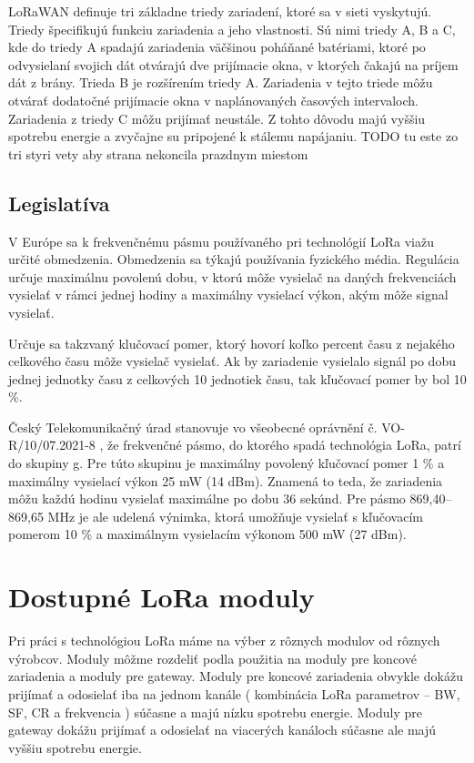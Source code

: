 \documentclass[slovak,master]{diploma}
\begin{document}
LoRaWAN definuje tri základne triedy zariadení, ktoré sa v sieti vyskytujú. Triedy špecifikujú funkciu zariadenia a jeho vlastnosti.
Sú nimi triedy A, B a C, kde do triedy A spadajú zariadenia väčšinou poháňané batériami, ktoré po odvysielaní svojich dát otvárajú dve prijímacie okna, 
v ktorých čakajú na príjem dát z brány.
Trieda B je rozšírením triedy A. Zariadenia v tejto triede môžu otvárať dodatočné prijímacie okna v naplánovaných časových intervaloch.
Zariadenia z triedy C môžu prijímať neustále. Z tohto dôvodu majú vyššiu spotrebu energie a zvyčajne su pripojené k stálemu napájaniu.
TODO tu este zo tri styri  vety aby strana nekoncila prazdnym miestom

\section{Legislatíva}
V Európe sa k frekvenčnému pásmu používaného pri technológií LoRa viažu určité obmedzenia. 
Obmedzenia sa týkajú používania fyzického média. Regulácia určuje maximálnu povolenú dobu, v ktorú môže vysielač na daných frekvenciách vysielať 
v rámci jednej hodiny a maximálny vysielací výkon, akým môže signal vysielať.

Určuje sa takzvaný klučovací pomer, ktorý hovorí koľko percent času z nejakého celkového času môže vysielač vysielať.
Ak by zariadenie vysielalo signál po dobu jednej jednotky času z celkových 10 jednotiek času, tak kľučovací pomer by bol 10 \%.

Český Telekomunikačný úrad stanovuje vo všeobecné oprávnění č. VO-R/10/07.2021-8 \cite{vor}, že 
frekvenčné pásmo, do ktorého spadá technológia LoRa, patrí do skupiny g. Pre túto skupinu je maximálny povolený kľučovací pomer 1 \% a maximálny 
vysielací výkon 25 mW (14 dBm). Znamená to teda, že zariadenia môžu každú hodinu vysielať maximálne po dobu 36 sekúnd.
Pre pásmo 869,40--869,65 MHz je ale udelená výnimka, ktorá umožňuje vysielať s kľučovacím pomerom 10 \% a maximálnym vysielacím výkonom 500 mW (27 dBm).

\chapter{Dostupné LoRa moduly }
Pri práci s technológiou LoRa máme na výber z rôznych modulov od rôznych výrobcov.
Moduly môžme rozdeliť podla použitia na moduly pre koncové zariadenia a moduly pre gateway.
Moduly pre koncové zariadenia obvykle dokážu prijímať a odosielať iba na jednom kanále ( kombinácia LoRa parametrov --  BW, SF, CR a frekvencia ) súčasne a majú 
nízku spotrebu energie. Moduly pre gateway dokážu prijímať a odosielať na viacerých kanáloch súčasne ale majú vyššiu spotrebu energie.
\end{document}
